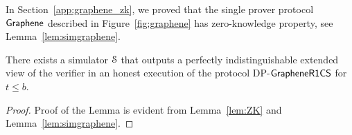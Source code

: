 %
%

In Section~\ref{app:graphene_zk}, we proved that the single prover protocol $\textsf{Graphene}$ described in Figure~\ref{fig:graphene} has zero-knowledge property, see Lemma~\ref{lem:simgraphene}.

\begin{lemma}\label{lem:simdpgraphene}
	There exists a simulator $\mathcal{S}$ that outputs a perfectly indistinguishable extended view of the verifier in an honest execution of the protocol DP-$\mathsf{GrapheneR1CS}$ for $t\leq b$.
\end{lemma}
\begin{proof}
Proof of the Lemma is evident from Lemma~\ref{lem:ZK} and Lemma~\ref{lem:simgraphene}.
\end{proof}


